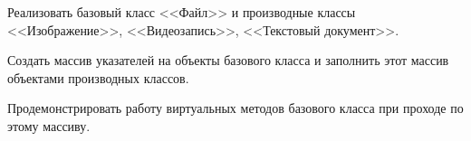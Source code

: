 Реализовать базовый класс <<Файл>> и производные классы
<<Изображение>>, <<Видеозапись>>, <<Текстовый документ>>.

Создать массив указателей на объекты базового класса и
заполнить этот массив объектами производных классов.

Продемонстрировать работу виртуальных методов базового
класса при проходе по этому массиву.
